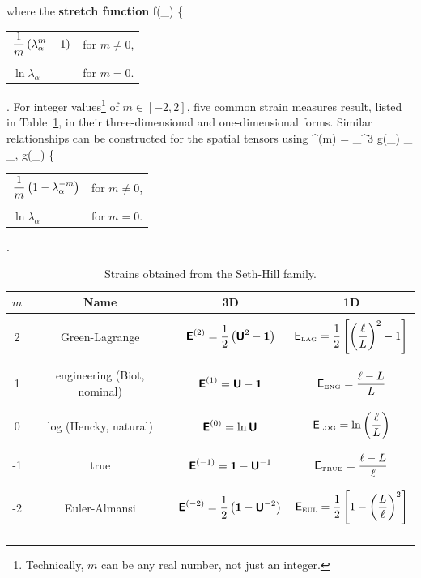 where the {\bf stretch function}
\be
 f(\lambda_{\alpha}) 
 \left\{ 
 \begin{tabular}{ll}
         $\dst\frac{1}{m}\left(\lambda^m_{\alpha} - 1 \right)$ & for $m\neq0$, \\
   & \\
         $\ln \lambda_{\alpha}$ & for $m=0$.
 \end{tabular}
 \right.
\ee
For integer values\footnote{Technically, $m$ can be any real number, not just an integer.} of $m \in [-2, 2]$, five common strain measures result, listed
in Table~\ref{tab:table_of_strains}, in their three-dimensional and one-dimensional forms.  Similar relationships can be constructed for the spatial tensors using
\be
\tebold^{(m)} 
    = \sum_{}^3 g(\lambda_{\alpha}) \; \vn_{\alpha} \otimes \vn_{\alpha},
\ee
\be
 g(\lambda_{\alpha}) 
 \left\{ 
 \begin{tabular}{ll}
     $\dst\frac{1}{m}\left(1 - \lambda^{-m}_{\alpha} \right)$ & for $m\neq0$, \\
   & \\
         $\ln \lambda_{\alpha}$ & for $m=0$.
 \end{tabular}
 \right.
\ee

\begin{table}[htb]
\caption{Strains obtained from the Seth-Hill family.}
\label{tab:table_of_strains}
\begin{center}
\begin{tabular}{|c|c|c|c|} \hline
 $m$ & {\bf Name} & {\bf 3D} & {\bf 1D} \\ \hline \hline
 & & & \\
 2 & Green-Lagrange 
   & $\mbox{\sffamily\bfseries E}^{(2)} = \displaystyle\frac{1}{2}\left(\mbox{\sffamily\bfseries U}^2 - \mbox{\boldmath $1$}\right)$ 
   & $\mathsf E_{\tiny\mbox{LAG}} = 
   \displaystyle\frac{1}{2}\left[\left(\displaystyle\frac{\ell}{L}\right)^2 - 1\right]$
   \\
   & & & \\ \hline
 & & & \\
 1 & engineering (Biot, nominal)
   & $\mbox{\sffamily\bfseries E}^{(1)} = \mbox{\sffamily\bfseries U} - \mbox{\boldmath $1$}$
   & $\mathsf E_{\tiny\mbox{ENG}} = \displaystyle\frac{\ell - L}{L}$
   \\
   & & & \\ \hline
 & & & \\
 0 & log (Hencky, natural)
   & $\mbox{\sffamily\bfseries E}^{(0)} = \ln\mbox{\sffamily\bfseries U}$
   & $\mathsf E_{\tiny\mbox{LOG}} = \ln\left(\displaystyle\frac{\ell}{L}\right)$
   \\
   & & & \\ \hline
 & & & \\
 -1 & true 
   & $\mbox{\sffamily\bfseries E}^{(-1)} = \mbox{\boldmath $1$} - \mbox{\sffamily\bfseries U}^{-1}$
   & $\mathsf E_{\tiny\mbox{TRUE}} = \displaystyle\frac{\ell - L}{\ell}$
   \\
   & & & \\ \hline
 & & & \\
 -2 & Euler-Almansi 
   & $\mbox{\sffamily\bfseries E}^{(-2)} = \displaystyle\frac{1}{2}\left(\mbox{\boldmath $1$} - \mbox{\sffamily\bfseries U}^{-2}\right)$
   & $\mathsf E_{\tiny\mbox{EUL}} = \displaystyle\frac{1}{2}
   \left[ 1 - \left(\displaystyle\frac{L}{\ell}\right)^2\right]$
   \\
   & & & \\ \hline
\end{tabular}
\end{center}
\end{table}

